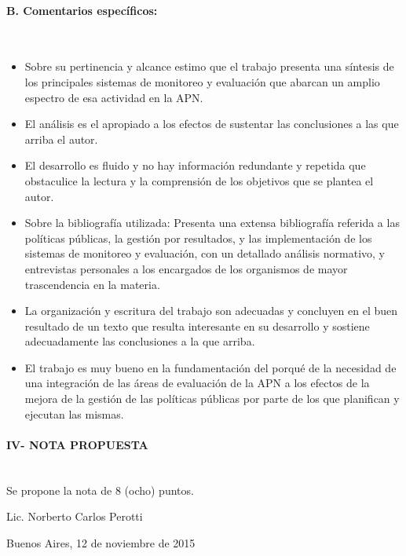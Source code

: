 \paragraph{B. Comentarios específicos:} \mbox{} \\
    \begin{itemize}
        \item Sobre su pertinencia y alcance estimo que el trabajo presenta una síntesis de los principales sistemas de monitoreo y evaluación que abarcan un amplio espectro de esa actividad en la APN.
        \item El análisis es el apropiado a los efectos de sustentar las conclusiones a las que arriba el autor.
        \item El desarrollo es fluido y no hay información redundante y repetida que obstaculice la lectura y la comprensión de los objetivos que se plantea el autor.
        \item Sobre la bibliografía utilizada: Presenta una extensa bibliografía referida a las políticas públicas, la gestión por resultados, y las implementación de los sistemas de monitoreo y evaluación, con un detallado análisis normativo, y entrevistas personales a los encargados de los organismos de mayor trascendencia en la materia.
        \item La organización y escritura del trabajo son adecuadas y concluyen en el buen resultado de un texto que resulta interesante en su desarrollo y sostiene adecuadamente las conclusiones a la que arriba.
        \item El trabajo es muy bueno en la fundamentación del porqué de la necesidad de una integración de las áreas de evaluación de la APN a los efectos de la mejora de la gestión de las políticas públicas por parte de los que planifican y ejecutan las mismas.
    \end{itemize}
\paragraph{IV- NOTA PROPUESTA} \mbox{} \\
Se propone la nota de 8 (ocho) puntos.
 
 
\vspace{3cm}
Lic. Norberto Carlos Perotti

\vspace{0.1cm}
Buenos Aires, 12 de noviembre de 2015
